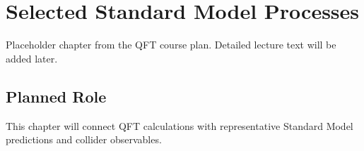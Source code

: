 \chapter{Selected Standard Model Processes}

\begin{remarkbox}
Placeholder chapter from the QFT course plan. Detailed lecture text will be added later.
\end{remarkbox}

\section{Planned Role}

This chapter will connect QFT calculations with representative Standard Model predictions and collider observables.
